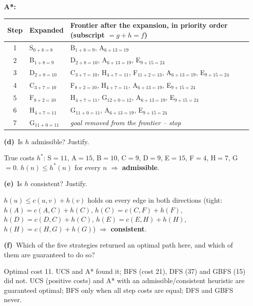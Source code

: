 \documentclass[11pt,a4paper]{article}
\newcommand{\subq}[1]{\par\smallskip\noindent\textbf{#1}\ }
\begin{document}
\begin{solbox}
\begin{center}
\begin{tabularx}{\linewidth}{c l >{\raggedright\arraybackslash}X}
\bottomrule\end{tabularx}\end{center}\textbf{A*:}\begin{center}\small\begin{tabularx}{\linewidth}{c l >{\raggedright\arraybackslash}X}\toprule
Step & Expanded & Frontier after the expansion, in priority order (subscript $=g+h=f$) \\ \midrule
1 & S$_{0+8=8}$ & B$_{1+8=9}$, A$_{6+13=19}$ \\
2 & B$_{1+8=9}$ & D$_{2+8=10}$, A$_{6+13=19}$, E$_{9+15=24}$ \\
3 & D$_{2+8=10}$ & C$_{3+7=10}$, H$_{4+7=11}$, F$_{11+2=13}$, A$_{6+13=19}$, E$_{9+15=24}$ \\
4 & C$_{3+7=10}$ & F$_{8+2=10}$, H$_{4+7=11}$, A$_{6+13=19}$, E$_{9+15=24}$ \\
5 & F$_{8+2=10}$ & H$_{4+7=11}$, G$_{12+0=12}$, A$_{6+13=19}$, E$_{9+15=24}$ \\
6 & H$_{4+7=11}$ & G$_{11+0=11}$, A$_{6+13=19}$, E$_{9+15=24}$ \\
7 & G$_{11+0=11}$ & \textit{goal removed from the frontier -- stop} \\
\bottomrule\end{tabularx}\end{center}
\end{solbox}
\subq{(d)}Is $h$ admissible? Justify.
\begin{solbox}
True costs $h^*$: S$=11$, A$=15$, B$=10$, C$=9$, D$=9$, E$=15$, F$=4$, H$=7$, G$=0$. $h(n)\le h^*(n)$ for every $n$ $\Rightarrow$ \textbf{admissible}.
\end{solbox}
\subq{(e)}Is $h$ consistent? Justify.
\begin{solbox}
$h(u)\le c(u,v)+h(v)$ holds on every edge in both directions (tight: $h(A)=c(A,C)+h(C)$, $h(C)=c(C,F)+h(F)$, $h(D)=c(D,C)+h(C)$, $h(E)=c(E,H)+h(H)$, $h(H)=c(H,G)+h(G)$) $\Rightarrow$ \textbf{consistent}.
\end{solbox}
\subq{(f)}Which of the five strategies returned an optimal path here, and which of them are guaranteed to do so?
\begin{solbox}
Optimal cost 11. UCS and A* found it; BFS (cost 21), DFS (37) and GBFS (15) did not. UCS (positive costs) and A* with an admissible/consistent heuristic are guaranteed optimal; BFS only when all step costs are equal; DFS and GBFS never.
\end{solbox}
\end{document}
